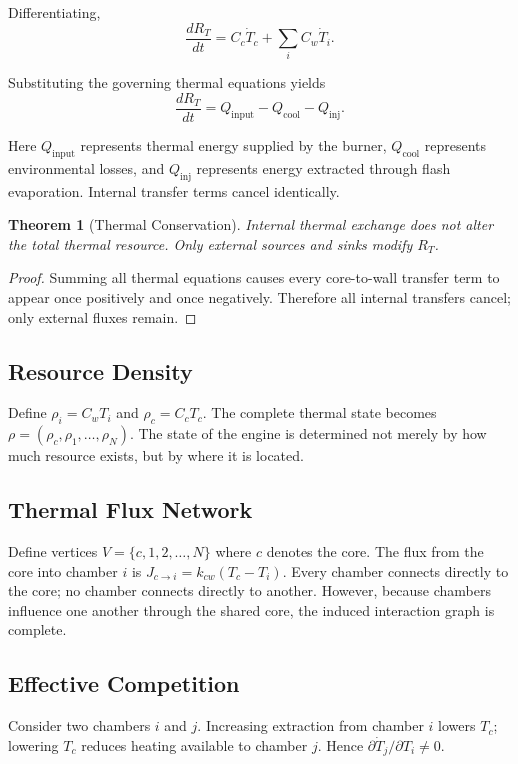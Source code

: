 \documentclass[12pt,a4paper]{article}
\newtheorem{theorem}{Theorem}[section]
\begin{document}
Differentiating,
\[
\frac{dR_T}{dt} = C_c \dot T_c + \sum_i C_w \dot T_i.
\]

Substituting the governing thermal equations yields
\[
\frac{dR_T}{dt} = Q_{\mathrm{input}} - Q_{\mathrm{cool}} - Q_{\mathrm{inj}}.
\]

Here $Q_{\mathrm{input}}$ represents thermal energy supplied by the burner, $Q_{\mathrm{cool}}$ represents environmental losses, and $Q_{\mathrm{inj}}$ represents energy extracted through flash evaporation. Internal transfer terms cancel identically.

\begin{theorem}[Thermal Conservation]
Internal thermal exchange does not alter the total thermal resource. Only external sources and sinks modify $R_T$.
\end{theorem}

\begin{proof}
Summing all thermal equations causes every core-to-wall transfer term to appear once positively and once negatively. Therefore all internal transfers cancel; only external fluxes remain.
\end{proof}

\subsection{Resource Density}

Define $\rho_i = C_w T_i$ and $\rho_c = C_c T_c$. The complete thermal state becomes $\rho = (\rho_c, \rho_1, \ldots, \rho_N)$. The state of the engine is determined not merely by how much resource exists, but by where it is located.

\subsection{Thermal Flux Network}

Define vertices $V = \{c, 1, 2, \ldots, N\}$ where $c$ denotes the core. The flux from the core into chamber $i$ is $J_{c \to i} = k_{cw}(T_c - T_i)$. Every chamber connects directly to the core; no chamber connects directly to another. However, because chambers influence one another through the shared core, the induced interaction graph is complete.

\subsection{Effective Competition}

Consider two chambers $i$ and $j$. Increasing extraction from chamber $i$ lowers $T_c$; lowering $T_c$ reduces heating available to chamber $j$. Hence $\partial \dot T_j / \partial T_i \neq 0$.
\end{document}
